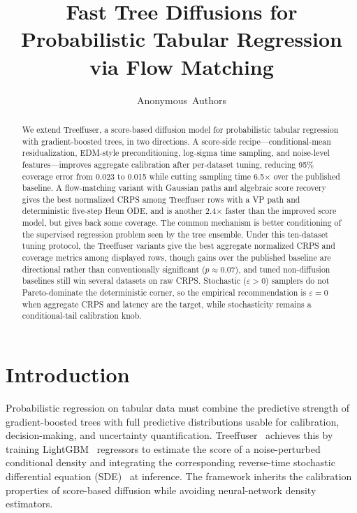 \documentclass{tpm2026}
\title{Fast Tree Diffusions for Probabilistic Tabular Regression via Flow Matching}
\author[1]{Anonymous~Authors}
\affil[1]{Anonymous Institution}
\begin{document}
\maketitle

\begin{abstract}
We extend Treeffuser, a score-based diffusion model for probabilistic tabular regression with gradient-boosted trees, in two directions. A score-side recipe---conditional-mean residualization, EDM-style preconditioning, log-sigma time sampling, and noise-level features---improves aggregate calibration after per-dataset tuning, reducing 95\% coverage error from 0.023 to 0.015 while cutting sampling time 6.5$\times$ over the published baseline. A flow-matching variant with Gaussian paths and algebraic score recovery gives the best normalized CRPS among Treeffuser rows with a VP path and deterministic five-step Heun ODE, and is another 2.4$\times$ faster than the improved score model, but gives back some coverage. The common mechanism is better conditioning of the supervised regression problem seen by the tree ensemble. Under this ten-dataset tuning protocol, the Treeffuser variants give the best aggregate normalized CRPS and coverage metrics among displayed rows, though gains over the published baseline are directional rather than conventionally significant ($p \approx 0.07$), and tuned non-diffusion baselines still win several datasets on raw CRPS. Stochastic ($\varepsilon > 0$) samplers do not Pareto-dominate the deterministic corner, so the empirical recommendation is $\varepsilon = 0$ when aggregate CRPS and latency are the target, while stochasticity remains a conditional-tail calibration knob.
\end{abstract}

\section{Introduction}\label{sec:intro}
Probabilistic regression on tabular data must combine the predictive strength of gradient-boosted trees with full predictive distributions usable for calibration, decision-making, and uncertainty quantification. Treeffuser~\citep{treeffuser} achieves this by training LightGBM~\citep{ke2017lightgbm} regressors to estimate the score of a noise-perturbed conditional density and integrating the corresponding reverse-time stochastic differential equation (SDE)~\citep{song2021score} at inference. The framework inherits the calibration properties of score-based diffusion while avoiding neural-network density estimators.
\end{document}

